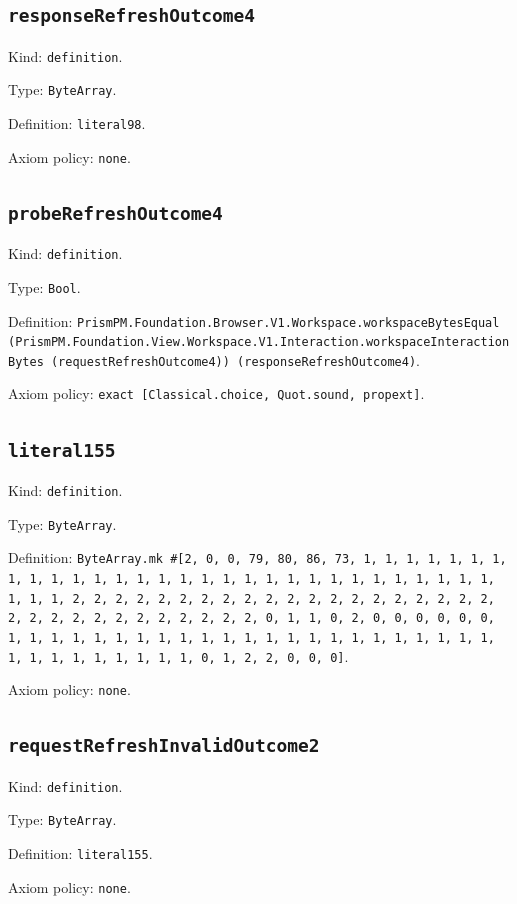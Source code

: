 \documentclass[11pt]{article}
\begin{document}
\subsection*{\texttt{responseRefreshOutcome4}}
\noindent Kind: \texttt{definition}.\par
\noindent Type: \texttt{ByteArray}.\par
\noindent Definition: \texttt{literal98}.\par
\noindent Axiom policy: \texttt{none}.\par
\subsection*{\texttt{probeRefreshOutcome4}}
\noindent Kind: \texttt{definition}.\par
\noindent Type: \texttt{Bool}.\par
\noindent Definition: \texttt{PrismPM.Foundation.Browser.V1.Workspace.workspaceBytesEqual (PrismPM.Foundation.View.Workspace.V1.Interaction.workspaceInteractionBytes (requestRefreshOutcome4)) (responseRefreshOutcome4)}.\par
\noindent Axiom policy: \texttt{exact [Classical.choice, Quot.sound, propext]}.\par
\subsection*{\texttt{literal155}}
\noindent Kind: \texttt{definition}.\par
\noindent Type: \texttt{ByteArray}.\par
\noindent Definition: \texttt{ByteArray.mk \#[2, 0, 0, 79, 80, 86, 73, 1, 1, 1, 1, 1, 1, 1, 1, 1, 1, 1, 1, 1, 1, 1, 1, 1, 1, 1, 1, 1, 1, 1, 1, 1, 1, 1, 1, 1, 1, 1, 1, 1, 2, 2, 2, 2, 2, 2, 2, 2, 2, 2, 2, 2, 2, 2, 2, 2, 2, 2, 2, 2, 2, 2, 2, 2, 2, 2, 2, 2, 2, 2, 2, 2, 0, 1, 1, 0, 2, 0, 0, 0, 0, 0, 0, 1, 1, 1, 1, 1, 1, 1, 1, 1, 1, 1, 1, 1, 1, 1, 1, 1, 1, 1, 1, 1, 1, 1, 1, 1, 1, 1, 1, 1, 1, 1, 1, 0, 1, 2, 2, 0, 0, 0]}.\par
\noindent Axiom policy: \texttt{none}.\par
\subsection*{\texttt{requestRefreshInvalidOutcome2}}
\noindent Kind: \texttt{definition}.\par
\noindent Type: \texttt{ByteArray}.\par
\noindent Definition: \texttt{literal155}.\par
\noindent Axiom policy: \texttt{none}.\par
\end{document}
